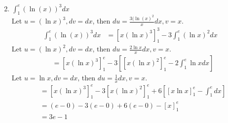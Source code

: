 \documentclass{article}
\begin{document}
\begin{enumerate}
\begin{align*}
    \end{align*}
    
    \item $\int_1^e (\ln(x))^3 dx$\\
    Let $u = (\ln x)^3, dv = dx$, then $du = \frac{3(\ln(x)^2}{x} dx, v = x$.
    \begin{align*}
        \int_1^e (\ln(x))^3 dx & = \left[ x(\ln x)^3\right]_1^3 -3 \int_1^e (\ln x)^2 dx
    \end{align*}
    Let $u = (\ln x)^2, dv = dx$, then $du = \frac{2 \ln x}{x} dx, v = x$.
    \begin{align*}
        & = \left[x (\ln x)^3\right]_1^e - 3 \left[ [x(\ln x)^2]_1^e - 2 \int_1^e \ln x dx \right]
    \end{align*}
    Let $u = \ln x, dv = dx$, then $du = \frac{1}{x} dx, v = x$.
    \begin{align*}
        & = \left[ x (\ln x)^3 \right]_1^e - 3 \left[ x (\ln x)^2 \right]_1^e + 6\left[ [x \ln x]_1^e - \int_1^e dx\right]\\
        & = (e - 0) - 3(e- 0) + 6(e - 0) - [x]_1^e\\
        & = 3e - 1
    \end{align*}
\end{enumerate}
\end{document}
